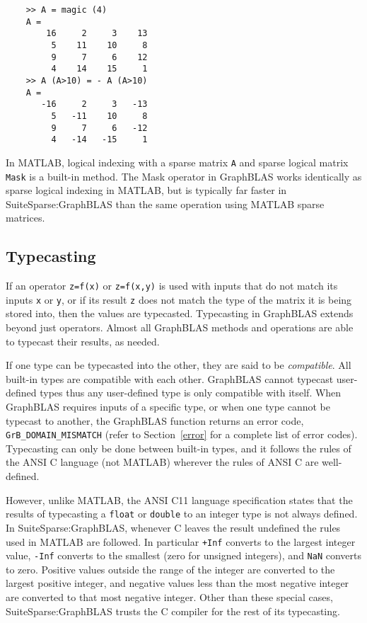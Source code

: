 \documentclass[12pt]{article}
\begin{document}
    \begin{mdframed}
    {\footnotesize
    \begin{verbatim}
    >> A = magic (4)
    A =
        16     2     3    13
         5    11    10     8
         9     7     6    12
         4    14    15     1
    >> A (A>10) = - A (A>10)
    A =
       -16     2     3   -13
         5   -11    10     8
         9     7     6   -12
         4   -14   -15     1 \end{verbatim} } \end{mdframed}

In MATLAB, logical indexing with a sparse matrix \verb'A' and sparse logical
matrix \verb'Mask' is a built-in method.  The Mask operator in GraphBLAS works
identically as sparse logical indexing in MATLAB, but is typically far faster
in SuiteSparse:GraphBLAS than the same operation using MATLAB sparse matrices.

\subsection{Typecasting} %
\label{typecasting}

If an operator \verb'z=f(x)' or \verb'z=f(x,y)' is used with inputs that do not
match its inputs \verb'x' or \verb'y', or if its result \verb'z' does not match
the type of the matrix it is being stored into, then the values are typecasted.
Typecasting in GraphBLAS extends beyond just operators.  Almost all GraphBLAS
methods and operations are able to typecast their results, as needed.

If one type can be typecasted into the other, they are said to be {\em
compatible}.  All built-in types are compatible with each other.  GraphBLAS
cannot typecast user-defined types thus any user-defined type is only
compatible with itself.  When GraphBLAS requires inputs of a specific type, or
when one type cannot be typecast to another, the GraphBLAS function returns an
error code, \verb'GrB_DOMAIN_MISMATCH' (refer to Section~\ref{error} for a
complete list of error codes).  Typecasting can only be done between built-in
types, and it follows the rules of the ANSI C language (not MATLAB) wherever
the rules of ANSI C are well-defined.

However, unlike MATLAB, the ANSI C11 language specification states that the
results of typecasting a \verb'float' or \verb'double' to an integer type is
not always defined.  In SuiteSparse:GraphBLAS, whenever C leaves the result
undefined the rules used in MATLAB are followed.  In particular \verb'+Inf'
converts to the largest integer value, \verb'-Inf' converts to the smallest
(zero for unsigned integers), and \verb'NaN' converts to zero.  Positive values
outside the range of the integer are converted to the largest positive integer,
and negative values less than the most negative integer are converted to that
most negative integer.  Other than these special cases, SuiteSparse:GraphBLAS
trusts the C compiler for the rest of its typecasting.
\end{document}
